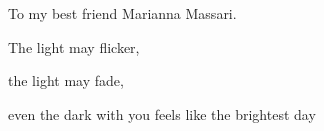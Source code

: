 \begin{dedication}
To my best friend Marianna Massari.\par
The light may flicker,\par
the light may fade,\par
even the dark with you feels like the brightest day
\end{dedication}